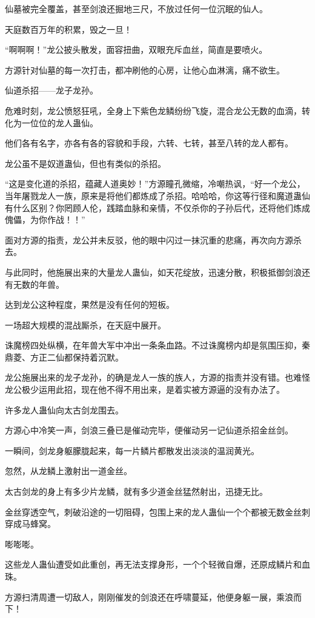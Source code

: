 \begin{this_body}
仙墓被完全覆盖，甚至剑浪还掘地三尺，不放过任何一位沉眠的仙人。

天庭数百万年的积累，毁之一旦！

“啊啊啊！”龙公披头散发，面容扭曲，双眼充斥血丝，简直是要喷火。

方源针对仙墓的每一次打击，都冲刷他的心房，让他心血淋漓，痛不欲生。

仙道杀招——龙子龙孙。

危难时刻，龙公愤怒狂吼，全身上下紫色龙鳞纷纷飞旋，混合龙公无数的血滴，转化为一位位的龙人蛊仙。

他们各有名字，亦各有各的容貌和手段，六转、七转，甚至八转的龙人都有。

龙公虽不是奴道蛊仙，但也有类似的杀招。

“这是变化道的杀招，蕴藏人道奥妙！”方源瞳孔微缩，冷嘲热讽，“好一个龙公，当年屠戮龙人一族，原来是将他们都炼成了杀招。哈哈哈，你这等行径和魔道蛊仙有什么区别？你罔顾人伦，践踏血脉和亲情，不仅杀你的子孙后代，还将他们炼成傀儡，为你作战！！”

面对方源的指责，龙公并未反驳，他的眼中闪过一抹沉重的悲痛，再次向方源杀去。

与此同时，他施展出来的大量龙人蛊仙，如天花绽放，迅速分散，积极抵御剑浪还有无数的年兽。

达到龙公这种程度，果然是没有任何的短板。

一场超大规模的混战厮杀，在天庭中展开。

诛魔榜四处纵横，在年兽大军中冲出一条条血路。不过诛魔榜内却是氛围压抑，秦鼎菱、方正二仙都保持着沉默。

龙公施展出来的龙子龙孙，的确是龙人一族的族人，方源的指责并没有错。也难怪龙公极少运用此招，现在他不得不用出来，是着实被方源逼的没有办法了。

许多龙人蛊仙向太古剑龙围去。

方源心中冷笑一声，剑浪三叠已是催动完毕，便催动另一记仙道杀招金丝剑。

一瞬间，剑龙身躯朦胧起来，每一片鳞片都散发出淡淡的温润黄光。

忽然，从龙鳞上激射出一道金丝。

太古剑龙的身上有多少片龙鳞，就有多少道金丝猛然射出，迅捷无比。

金丝穿透空气，刺破沿途的一切阻碍，包围上来的龙人蛊仙一个个都被无数金丝刺穿成马蜂窝。

嘭嘭嘭。

这些龙人蛊仙遭受如此重创，再无法支撑身形，一个个轻微自爆，还原成鳞片和血珠。

方源扫清周遭一切敌人，刚刚催发的剑浪还在呼啸蔓延，他便身躯一展，乘浪而下！


\end{this_body}
